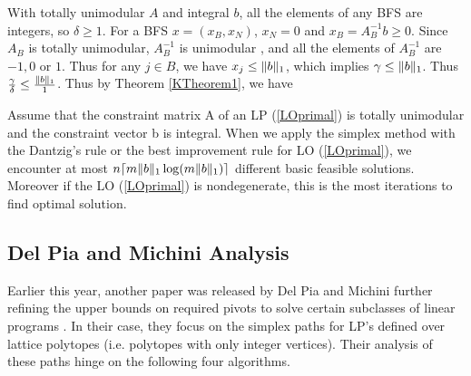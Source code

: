 \documentclass[11pt]{article}
\begin{document}
With totally unimodular $A$ and integral $b$, all the elements of any BFS are integers, so $\delta \ge 1$. For a BFS $x = (x_B, x_N)$, $x_N = 0$ and $x_B = A_B^{-1}b \ge 0$. Since $A_B$ is totally unimodular, $A_B^{-1}$ is unimodular \cite{kitahara2013bound}, and all the elements of $A_B^{-1}$ are $-1, 0$ or $1$. Thus for any $j \in B$, we have $x_j \le \lVert b\rVert_1$, which implies $\gamma \le \lVert b\rVert_1$. Thus $\frac{\gamma}{\delta} \le \frac{\lVert b\rVert_1}{1}$. Thus by Theorem \ref{KTheorem1}, we have
\begin{corollary}
Assume that the constraint matrix A of an LP (\ref{LOprimal}) is totally unimodular and the constraint vector b is integral. When we apply the simplex method with the Dantzig's rule or the best improvement rule for LO (\ref{LOprimal}), we encounter at most $n\lceil m \lVert b\rVert_1\log(m\lVert b\rVert_1)\rceil$ different basic feasible solutions. Moreover if the LO (\ref{LOprimal}) is nondegenerate, this is the most iterations to find optimal solution. 
\end{corollary}


\subsection{Del Pia and Michini Analysis}
Earlier this year, another paper was released by Del Pia and Michini further refining the upper bounds on required pivots to solve certain subclasses of linear programs \cite{pia}. In their case, they focus on the simplex paths for LP's defined over lattice polytopes (i.e. polytopes with only integer vertices). Their analysis of these paths hinge on the following four algorithms.
\end{document}

